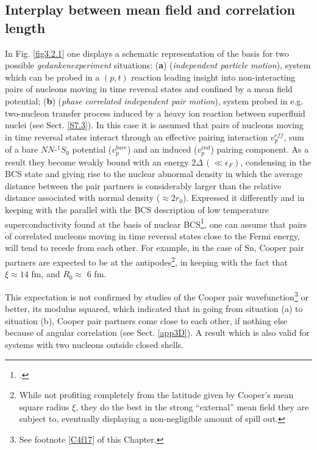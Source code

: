 \subsection{Interplay between mean field and correlation length}\label{S4.3.1}
In Fig. \ref{fig3.2.1} one displays a schematic representation of the basis for two possible \textit{gedankenexperiment} situations: (\textbf{a}) (\textit{independent particle motion}), system which can be probed in a $(p,t)$ reaction leading insight into  non-interacting pairs of nucleons moving in time reversal states and confined by a mean field potential; (\textbf{b}) (\textit{phase correlated independent pair motion}), system probed in e.g. two-nucleon transfer process induced by  a heavy ion reaction between superfluid nuclei  (see Sect. \ref{S7.3}). In this case it is assumed that pairs of nucleons moving in time reversal states interact through an effective pairing interaction $v_p^{eff}$, sum of a bare $NN$-$^1S_0$ potential ($v_p^{bare}$) and an induced ($v_p^{ind}$) pairing component. As a result they become weakly bound with an energy $2\Delta\,(\ll\epsilon_F)$, condensing  in the BCS state and giving rise to the nuclear abnormal density in which the average distance between the pair partners is considerably larger than the relative distance associated with normal density ($\approx2r_0$). Expressed it differently and in keeping with the parallel  with the BCS description of low temperature superconductivity found at the basis of nuclear BCS\footnote{\cite{Bohr:58}.}, one can assume that pairs of correlated nucleons moving in time reversal states close to the Fermi energy, will tend to recede from each other. For example, in the case of Sn, Cooper pair partners are expected to be at the antipodes\footnote{While not profiting completely from the latitude given by Cooper's mean square radius $\xi$, they do the best in the strong ``external'' mean field they are subject to, eventually displaying a non-negligible amount of spill out.}, in keeping with the fact that $\xi\approx14$ fm, and $R_0\approx$ 6 fm.

This expectation is not confirmed by studies of the Cooper pair wavefunction\footnote{See footnote \ref{C4f17} of this Chapter.} or better, its modulus squared, which indicated that in going from situation (a) to situation (b), Cooper pair partners come close to each other, if nothing else because of angular correlation (see Sect. \ref{app3D}). A result which is also valid for systems with two nucleons outside closed shells. 


